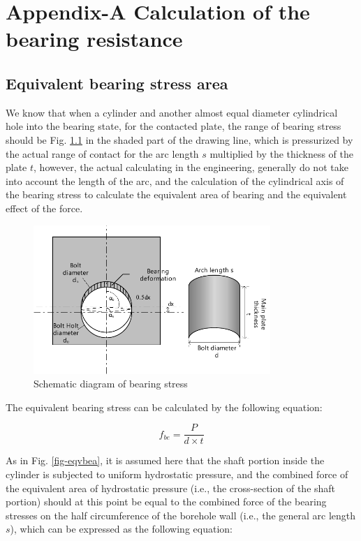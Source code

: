 \chapter{Appendix-A Calculation of the bearing resistance}
\label{app1}
\onehalfspacing



\section{Equivalent bearing stress area}

We know that when a cylinder and another almost equal diameter cylindrical hole into the bearing state, for the contacted plate, the range of bearing stress should be Fig. \ref{fig-shce-bea} in the shaded part of the drawing line, which is pressurized by the actual range of contact for the arc length $s$ multiplied by the thickness of the plate $t$, however, the actual calculating in the engineering, generally do not take into account the length of the arc, and the calculation of the cylindrical axis of the bearing stress to calculate the equivalent area of bearing and the equivalent effect of the force.

\begin{figure}
    \centering
    \includegraphics[width=0.8\textwidth]{imgs/app/shce-bea.pdf}
    \caption{Schematic diagram of bearing stress}
    \label{fig-shce-bea}
\end{figure}

The equivalent bearing stress can be calculated by the following equation:

\begin{equation}
    f_{be} = \frac{P}{d \times t}
\end{equation}


As in Fig. \ref{fig-eqvbea}, it is assumed here that the shaft portion inside the cylinder is subjected to uniform hydrostatic pressure, and the combined force of the equivalent area of hydrostatic pressure (i.e., the cross-section of the shaft portion) should at this point be equal to the combined force of the bearing stresses on the half circumference of the borehole wall (i.e., the general arc length $s$), which can be expressed as the following equation:

